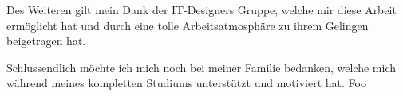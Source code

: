 Des Weiteren gilt mein Dank der IT-Designers Gruppe, welche mir diese Arbeit ermöglicht hat und durch eine
tolle Arbeitsatmosphäre zu ihrem Gelingen beigetragen hat.


Schlussendlich möchte ich mich noch bei meiner Familie bedanken, welche mich während meines
kompletten Studiums unterstützt und motiviert hat. Foo

\newpage
